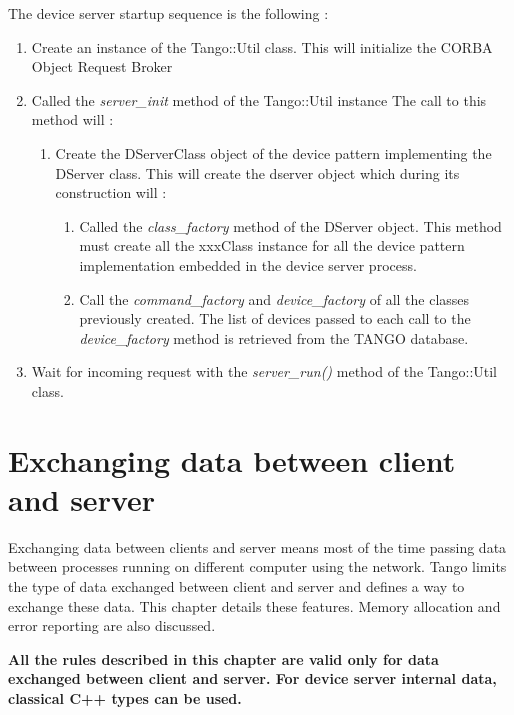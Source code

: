 The device server startup sequence is the following :
\begin{enumerate}
\item Create an instance of the Tango::Util class. This will initialize
the CORBA Object Request Broker
\item Called the \emph{server\_init} method of the Tango::Util
instance The call to this method will :

\begin{enumerate}
\item Create the DServerClass object of the device pattern implementing
the DServer class. This will create the dserver object
which during its construction will :

\begin{enumerate}
\item Called the \emph{class\_factory} method of the
DServer object. This method must create all the xxxClass instance
for all the device pattern implementation embedded in the device server
process.
\item Call the \emph{command\_factory} and \emph{device\_factory}
of all the classes previously created. The list of devices passed
to each call to the \emph{device\_factory} method is retrieved from
the TANGO database.
\end{enumerate}
\end{enumerate}
\item Wait for incoming request with the \emph{server\_run()}
method of the Tango::Util class.
\end{enumerate}

\section{Exchanging data between client and server\label{Data exchange}}

Exchanging data between clients and server means most of the time
passing data between processes running on different computer using
the network. Tango limits the type of data exchanged between client
and server and defines a way to exchange these data. This chapter
details these features. Memory allocation and error reporting are
also discussed.

\textbf{All the rules described in this chapter are valid only for
data exchanged between client and server. For device server internal
data, classical C++ types can be used.}

